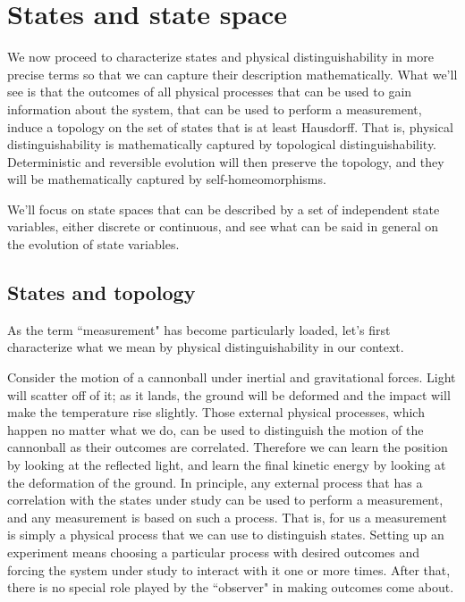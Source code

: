 \documentclass[smallextended]{svjour3}
\numberwithin{equation}{section}
\theoremstyle{definition}
\begin{document}
\section{States and state space}
\label{sec:dynamical_systems}



We now proceed to characterize states and physical distinguishability in more precise terms so that we can capture their description mathematically. What we'll see is that the outcomes of all physical processes that can be used to gain information about the system, that can be used to perform a measurement, induce a topology on the set of states that is at least Hausdorff. That is, physical distinguishability is mathematically captured by topological distinguishability. Deterministic and reversible evolution will then preserve the topology, and they will be mathematically captured by self-homeomorphisms.

We'll focus on state spaces that can be described by a set of independent state variables, either discrete or continuous, and see what can be said in general on the evolution of state variables.

\subsection{States and topology}

As the term ``measurement" has become particularly loaded, let's first characterize what we mean by physical distinguishability in our context.

Consider the motion of a cannonball under inertial and gravitational forces. Light will scatter off of it; as it lands, the ground will be deformed and the impact will make the temperature rise slightly. Those external physical processes, which happen no matter what we do, can be used to distinguish the motion of the cannonball as their outcomes are correlated. Therefore we can learn the position by looking at the reflected light, and learn the final kinetic energy by looking at the deformation of the ground. In principle, any external process that has a correlation with the states under study can be used to perform a measurement, and any measurement is based on such a process. That is, for us a measurement is simply a physical process that we can use to distinguish states. Setting up an experiment means choosing a particular process with desired outcomes and forcing the system under study to interact with it one or more times. After that, there is no special role played by the ``observer" in making outcomes come about.
\end{document}
